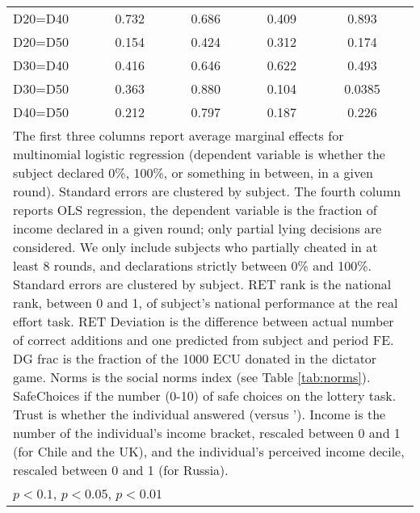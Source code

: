 \begin{tabular}{l|cccccc|cc}
D20=D40         &    0.732         &         &    0.686         &         &    0.409         &         &    0.893         &         \\
D20=D50         &    0.154         &         &    0.424         &         &    0.312         &         &    0.174         &         \\
D30=D40         &    0.416         &         &    0.646         &         &    0.622         &         &    0.493         &         \\
D30=D50         &    0.363         &         &    0.880         &         &    0.104         &         &   0.0385         &         \\
D40=D50         &    0.212         &         &    0.797         &         &    0.187         &         &    0.226         &         \\
\hline\hline
\multicolumn{9}{p{16cm}}{\tiny The first three columns report average marginal effects for multinomial logistic regression (dependent variable is whether the subject declared 0\%, 100\%, or something in between, in a given round). Standard errors are clustered by subject. The fourth column reports OLS regression, the dependent variable is the fraction of income declared in a given round; only partial lying decisions are considered. We only include subjects who partially cheated in at least 8 rounds, and declarations strictly between 0\% and 100\%. Standard errors are clustered by subject. RET rank is the national rank, between 0 and 1, of subject's national performance at the real effort task. RET Deviation is the difference between actual number of correct additions and one predicted from subject and period FE. DG frac is the fraction of the 1000 ECU donated in the dictator game. Norms is the social norms index (see Table \ref{tab:norms}). SafeChoices if the number (0-10) of safe choices on the lottery task. Trust is whether the individual answered  (versus '). Income is the number of the individual's income bracket, rescaled between 0 and 1 (for Chile and the UK), and the individual's perceived income decile, rescaled between 0 and 1 (for Russia).}\\
\multicolumn{9}{l}{\tiny \sym{*} \(p<0.1\), \sym{**} \(p<0.05\), \sym{***} \(p<0.01\)}\\
\end{tabular}
